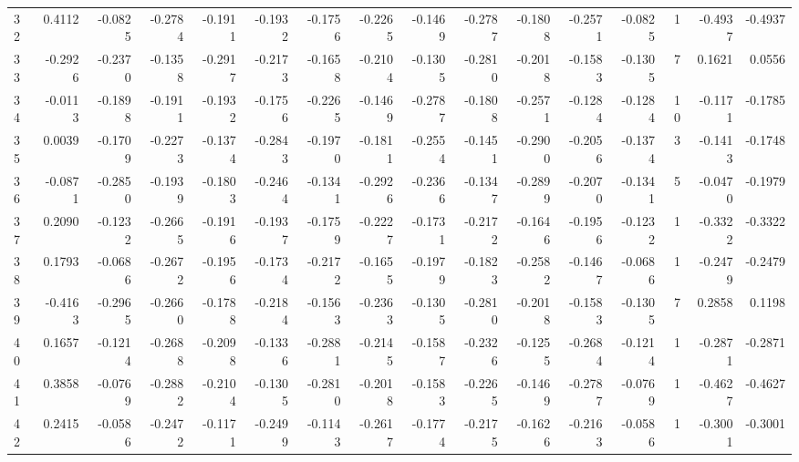 \begin{tabular}{lrrrrrrrrrrrrrrr}
32  &      0.4112 & -0.0825 & -0.2784 & -0.1911 & -0.1932 & -0.1756 & -0.2265 & -0.1469 & -0.2787 & -0.1808 &  -0.2571 &    -0.0825 &      1 &                   -0.4937 &                    -0.4937 \\
33  &     -0.2926 & -0.2370 & -0.1358 & -0.2917 & -0.2173 & -0.1658 & -0.2104 & -0.1305 & -0.2810 & -0.2018 &  -0.1583 &    -0.1305 &      7 &                    0.1621 &                     0.0556 \\
34  &     -0.0113 & -0.1898 & -0.1911 & -0.1932 & -0.1756 & -0.2265 & -0.1469 & -0.2787 & -0.1808 & -0.2571 &  -0.1284 &    -0.1284 &     10 &                   -0.1171 &                    -0.1785 \\
35  &      0.0039 & -0.1709 & -0.2273 & -0.1374 & -0.2843 & -0.1970 & -0.1811 & -0.2554 & -0.1451 & -0.2900 &  -0.2056 &    -0.1374 &      3 &                   -0.1413 &                    -0.1748 \\
36  &     -0.0871 & -0.2850 & -0.1939 & -0.1803 & -0.2464 & -0.1341 & -0.2926 & -0.2366 & -0.1347 & -0.2899 &  -0.2070 &    -0.1341 &      5 &                   -0.0470 &                    -0.1979 \\
37  &      0.2090 & -0.1232 & -0.2665 & -0.1916 & -0.1937 & -0.1759 & -0.2227 & -0.1731 & -0.2172 & -0.1646 &  -0.1956 &    -0.1232 &      1 &                   -0.3322 &                    -0.3322 \\
38  &      0.1793 & -0.0686 & -0.2672 & -0.1956 & -0.1734 & -0.2172 & -0.1655 & -0.1979 & -0.1823 & -0.2582 &  -0.1467 &    -0.0686 &      1 &                   -0.2479 &                    -0.2479 \\
39  &     -0.4163 & -0.2965 & -0.2660 & -0.1788 & -0.2184 & -0.1563 & -0.2363 & -0.1305 & -0.2810 & -0.2018 &  -0.1583 &    -0.1305 &      7 &                    0.2858 &                     0.1198 \\
40  &      0.1657 & -0.1214 & -0.2688 & -0.2098 & -0.1336 & -0.2881 & -0.2145 & -0.1587 & -0.2326 & -0.1255 &  -0.2684 &    -0.1214 &      1 &                   -0.2871 &                    -0.2871 \\
41  &      0.3858 & -0.0769 & -0.2882 & -0.2104 & -0.1305 & -0.2810 & -0.2018 & -0.1583 & -0.2265 & -0.1469 &  -0.2787 &    -0.0769 &      1 &                   -0.4627 &                    -0.4627 \\
42  &      0.2415 & -0.0586 & -0.2472 & -0.1171 & -0.2499 & -0.1143 & -0.2617 & -0.1774 & -0.2175 & -0.1626 &  -0.2163 &    -0.0586 &      1 &                   -0.3001 &                    -0.3001 \\

\end{tabular}
